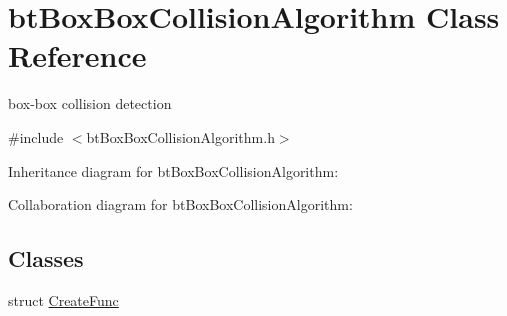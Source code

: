 \hypertarget{classbt_box_box_collision_algorithm}{\section{bt\+Box\+Box\+Collision\+Algorithm Class Reference}
\label{classbt_box_box_collision_algorithm}
}


box-\/box collision detection  




{\ttfamily \#include $<$bt\+Box\+Box\+Collision\+Algorithm.\+h$>$}



Inheritance diagram for bt\+Box\+Box\+Collision\+Algorithm\+:


Collaboration diagram for bt\+Box\+Box\+Collision\+Algorithm\+:
\subsection*{Classes}
\begin{DoxyCompactItemize}
\item 
struct \hyperlink{structbt_box_box_collision_algorithm_1_1_create_func}{Create\+Func}
\end{DoxyCompactItemize}
